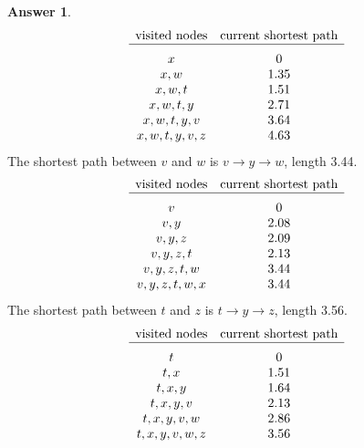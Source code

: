 \documentclass[article, 12pt]{article}
\theoremstyle{definition}
\newtheorem{answer}{Answer}
\begin{document}
    \begin{answer}
        \begin{align*}\begin{array}{cc}
            \text{visited nodes} & \text{current shortest path} \\
            \hline \rule{0pt}{1.2\normalbaselineskip}
            x & 0 \\ 
            x,w & 1.35 \\ 
            x,w,t & 1.51 \\ 
            x,w,t,y & 2.71 \\ 
            x,w,t,y,v & 3.64 \\ 
            x,w,t,y,v,z & 4.63
        \end{array}\end{align*}
        The shortest path between $v$ and $w$ is $v \to y \to w$, length 3.44. 
         \begin{align*}\begin{array}{cc}
            \text{visited nodes} & \text{current shortest path} \\
            \hline \rule{0pt}{1.2\normalbaselineskip}
            v & 0 \\
            v,y & 2.08 \\
            v,y,z & 2.09 \\
            v,y,z,t & 2.13 \\
            v,y,z,t,w & 3.44 \\
            v,y,z,t,w,x & 3.44
        \end{array}\end{align*}
        The shortest path between $t$ and $z$ is $t \to y \to z$, length 3.56. 
         \begin{align*}\begin{array}{cc}
            \text{visited nodes} & \text{current shortest path} \\
            \hline \rule{0pt}{1.2\normalbaselineskip}
            t & 0 \\
            t,x & 1.51 \\
            t,x,y & 1.64 \\
            t,x,y,v & 2.13 \\
            t,x,y,v,w & 2.86 \\
            t,x,y,v,w,z & 3.56
        \end{array}\end{align*}
    \end{answer}
\end{document}
